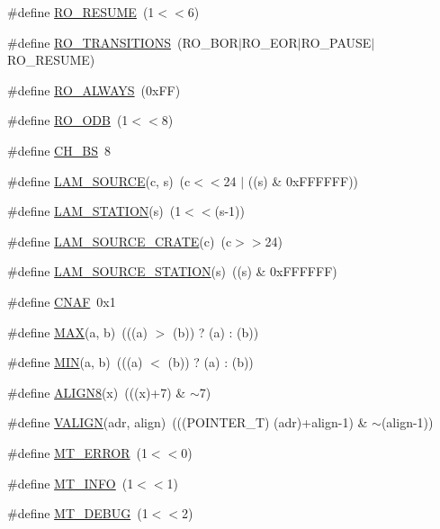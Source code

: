 \begin{DoxyCompactItemize}
\#define \hyperlink{group__mdefineh_ga549159f6ef3ef7c17261bcccecbe57ec}{RO\_\-RESUME}~(1$<$$<$6)
\item 
\#define \hyperlink{group__mdefineh_gadcbbd9e66d9455950d508d10b32b1f74}{RO\_\-TRANSITIONS}~(RO\_\-BOR$|$RO\_\-EOR$|$RO\_\-PAUSE$|$RO\_\-RESUME)
\item 
\#define \hyperlink{group__mdefineh_gafb61c915b4df610eb54eeeb781fc2f75}{RO\_\-ALWAYS}~(0xFF)
\item 
\#define \hyperlink{group__mdefineh_ga2de85e3b635c54456698533ebfc5635d}{RO\_\-ODB}~(1$<$$<$8)
\item 
\#define \hyperlink{group__midasincludecode_gaf5ec05509b0e59d4796795063e6c01d3}{CH\_\-BS}~8
\item 
\#define \hyperlink{group__midasincludecode_ga93fde3913a488880c4f96267e24579ee}{LAM\_\-SOURCE}(c, s)~(c$<$$<$24 $|$ ((s) \& 0xFFFFFF))
\item 
\#define \hyperlink{group__midasincludecode_ga479219e07f43223f74ff8638705a804e}{LAM\_\-STATION}(s)~(1$<$$<$(s-\/1))
\item 
\#define \hyperlink{group__midasincludecode_gafac465450c8035c37ba5482970e026eb}{LAM\_\-SOURCE\_\-CRATE}(c)~(c$>$$>$24)
\item 
\#define \hyperlink{group__midasincludecode_gae70f372186346224788f2980de071736}{LAM\_\-SOURCE\_\-STATION}(s)~((s) \& 0xFFFFFF)
\item 
\#define \hyperlink{group__midasincludecode_gaabc611f59210401f11ea4247291c4468}{CNAF}~0x1
\item 
\#define \hyperlink{group__mmacroh_gafa99ec4acc4ecb2dc3c2d05da15d0e3f}{MAX}(a, b)~(((a) $>$ (b)) ? (a) : (b))
\item 
\#define \hyperlink{group__mmacroh_ga3acffbd305ee72dcd4593c0d8af64a4f}{MIN}(a, b)~(((a) $<$ (b)) ? (a) : (b))
\item 
\#define \hyperlink{group__mmacroh_ga46bf3ace1698ee72389c30bc61d78686}{ALIGN8}(x)~(((x)+7) \& $\sim$7)
\item 
\#define \hyperlink{group__mmacroh_ga03bfa072452094d4d31ce3d304438f14}{VALIGN}(adr, align)~(((POINTER\_\-T) (adr)+align-\/1) \& $\sim$(align-\/1))
\item 
\#define \hyperlink{group__mdefineh_gafb24605c905f91417535771185913d07}{MT\_\-ERROR}~(1$<$$<$0)
\item 
\#define \hyperlink{group__mdefineh_ga5bf211121ab25c5d13f8c2f272b9ca25}{MT\_\-INFO}~(1$<$$<$1)
\item 
\#define \hyperlink{group__mdefineh_gad357af6d472b906b1e269f94f68c97b3}{MT\_\-DEBUG}~(1$<$$<$2)

\end{DoxyCompactItemize}
